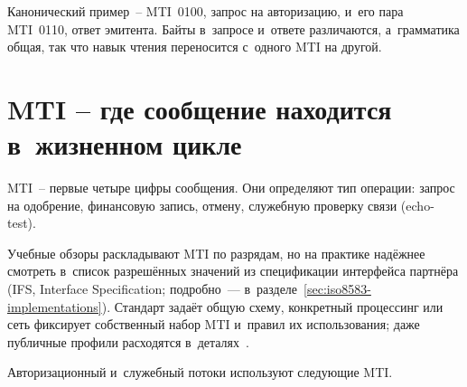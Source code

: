 Канонический пример~-- MTI~0100, запрос на авторизацию, и~его пара MTI~0110, ответ эмитента.
Байты в~запросе и~ответе различаются, а~грамматика общая, так что навык чтения переносится с~одного MTI на другой.

\section{MTI -- где сообщение находится в~жизненном цикле}\label{sec:iso8583-mti}

MTI~-- первые четыре цифры сообщения. Они определяют тип операции: запрос на одобрение, финансовую запись, отмену, служебную проверку связи (echo-test).

Учебные обзоры раскладывают MTI по разрядам, но на практике надёжнее смотреть в~список разрешённых значений из спецификации интерфейса партнёра (IFS, Interface Specification; подробно~--- в~разделе~\ref{sec:iso8583-implementations}).
Стандарт задаёт общую схему, конкретный процессинг или сеть фиксирует собственный набор MTI и~правил их использования; даже публичные профили расходятся в~деталях~\cite{iso-8583-2023,fis-iso8583-guide-2023}.

Авторизационный и~служебный потоки используют следующие MTI.

